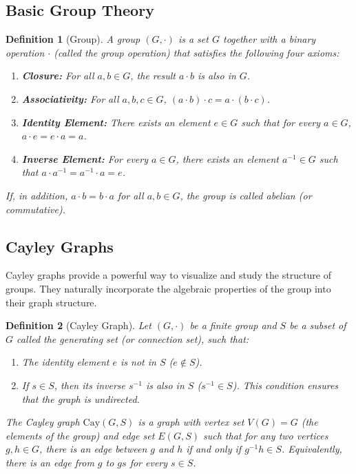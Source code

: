 \documentclass[12pt]{article}
\newtheorem{definition}{Definition}[section]
\theoremstyle{remark}
\begin{document}
\subsection{Basic Group Theory}
\begin{definition}[Group]
A \emph{group} $(G, \cdot)$ is a set $G$ together with a binary operation $\cdot$ (called the group operation) that satisfies the following four axioms:
\begin{enumerate}
    \item \textbf{Closure:} For all $a, b \in G$, the result $a \cdot b$ is also in $G$.
    \item \textbf{Associativity:} For all $a, b, c \in G$, $(a \cdot b) \cdot c = a \cdot (b \cdot c)$.
    \item \textbf{Identity Element:} There exists an element $e \in G$ such that for every $a \in G$, $a \cdot e = e \cdot a = a$.
    \item \textbf{Inverse Element:} For every $a \in G$, there exists an element $a^{-1} \in G$ such that $a \cdot a^{-1} = a^{-1} \cdot a = e$.
\end{enumerate}
If, in addition, $a \cdot b = b \cdot a$ for all $a, b \in G$, the group is called \emph{abelian} (or commutative).
\end{definition}

\subsection{Cayley Graphs}
Cayley graphs provide a powerful way to visualize and study the structure of groups. They naturally incorporate the algebraic properties of the group into their graph structure.

\begin{definition}[Cayley Graph]
Let $(G, \cdot)$ be a finite group and $S$ be a subset of $G$ called the \emph{generating set} (or connection set), such that:
\begin{enumerate}
    \item The identity element $e$ is not in $S$ ($e \notin S$).
    \item If $s \in S$, then its inverse $s^{-1}$ is also in $S$ ($s^{-1} \in S$). This condition ensures that the graph is undirected.
\end{enumerate}
The \emph{Cayley graph} $\text{Cay}(G, S)$ is a graph with vertex set $V(G) = G$ (the elements of the group) and edge set $E(G, S)$ such that for any two vertices $g, h \in G$, there is an edge between $g$ and $h$ if and only if $g^{-1}h \in S$. Equivalently, there is an edge from $g$ to $gs$ for every $s \in S$.
\end{definition}
\end{document}
